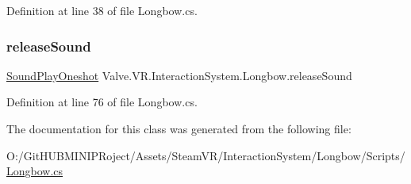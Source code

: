 Definition at line 38 of file Longbow.\+cs.

\mbox{\label{class_valve_1_1_v_r_1_1_interaction_system_1_1_longbow_a16d66d2b39ae5cb1693cae811a3e28e4}} 
\subsubsection{\texorpdfstring{releaseSound}{releaseSound}}
{\footnotesize\ttfamily \mbox{\hyperlink{class_valve_1_1_v_r_1_1_interaction_system_1_1_sound_play_oneshot}{Sound\+Play\+Oneshot}} Valve.\+V\+R.\+Interaction\+System.\+Longbow.\+release\+Sound}



Definition at line 76 of file Longbow.\+cs.



The documentation for this class was generated from the following file\+:\begin{DoxyCompactItemize}
\item 
O\+:/\+Git\+H\+U\+B\+M\+I\+N\+I\+P\+Roject/\+Assets/\+Steam\+V\+R/\+Interaction\+System/\+Longbow/\+Scripts/\mbox{\hyperlink{_longbow_8cs}{Longbow.\+cs}}\end{DoxyCompactItemize}
